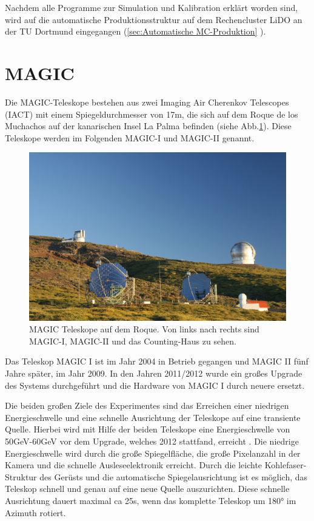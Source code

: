 Nachdem alle Programme zur Simulation und Kalibration erklärt worden sind, wird auf die automatische Produktionsstruktur auf dem Rechencluster LiDO an der TU Dortmund eingegangen (\autoref{sec:Automatische MC-Produktion} ).



\section{MAGIC}
\label{sec:MAGIC}

Die MAGIC-Teleskope bestehen aus zwei Imaging Air Cherenkov Telescopes (IACT) mit einem Spiegeldurchmesser von 17m, die sich auf dem Roque de los Muchachos auf der kanarischen Insel La Palma befinden (siehe Abb.\ref{MAGIC Teleskope}).
Diese Teleskope werden im Folgenden MAGIC-I und MAGIC-II genannt.

\begin{figure}
    \centering
    \includegraphics[width=\textwidth]{./Plots/03_MonteCarlos/MAGIC-Telescopes.jpg}
    \caption{MAGIC Teleskope auf dem Roque. Von links nach rechts sind MAGIC-I, MAGIC-II und das Counting-Haus zu sehen.\cite{MAGIC-Homepage}}
    \label{MAGIC Teleskope}
\end{figure}

Das Teleskop MAGIC I ist im Jahr 2004 in Betrieb gegangen und MAGIC II fünf Jahre später, im Jahr 2009.
In den Jahren 2011/2012 wurde ein großes Upgrade des Systems durchgeführt und die Hardware von MAGIC I durch neuere ersetzt.

Die beiden großen Ziele des Experimentes sind das Erreichen einer niedrigen Energieschwelle und eine schnelle Ausrichtung der Teleskope auf eine transiente Quelle.
Hierbei wird mit Hilfe der beiden Teleskope eine Energieschwelle von 50GeV-60GeV vor dem Upgrade, welches 2012 stattfand, erreicht \cite{MAGIC_Telescopes}.
Die niedrige Energieschwelle wird durch die große Spiegelfläche, die große Pixelanzahl in der Kamera und die schnelle Ausleseelektronik erreicht.
Durch die leichte Kohlefaser-Struktur des Gerüsts und die automatische Spiegelausrichtung ist es möglich, das Teleskop schnell und genau auf eine neue Quelle auszurichten.
Diese schnelle Ausrichtung dauert maximal ca 25s, wenn das komplette Teleskop um 180° im Azimuth rotiert.

